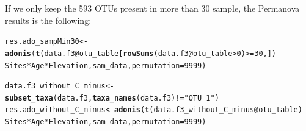 \documentclass[12pt]{article}\usepackage[]{graphicx}\usepackage[]{color}
\makeatletter
\newcommand{\hlnum}[1]{\textcolor[rgb]{0.686,0.059,0.569}{#1}}%
\newcommand{\hlstr}[1]{\textcolor[rgb]{0.192,0.494,0.8}{#1}}%
\newcommand{\hlopt}[1]{\textcolor[rgb]{0,0,0}{#1}}%
\newcommand{\hlstd}[1]{\textcolor[rgb]{0.345,0.345,0.345}{#1}}%
\newcommand{\hlkwb}[1]{\textcolor[rgb]{0.69,0.353,0.396}{#1}}%
\newcommand{\hlkwc}[1]{\textcolor[rgb]{0.333,0.667,0.333}{#1}}%
\newcommand{\hlkwd}[1]{\textcolor[rgb]{0.737,0.353,0.396}{\textbf{#1}}}%
\newenvironment{kframe}{%
 \def\at@end@of@kframe{}%
 \ifinner\ifhmode%
  \def\at@end@of@kframe{\end{minipage}}%
  \begin{minipage}{\columnwidth}%
 \fi\fi%
 \def\FrameCommand##1{\hskip\@totalleftmargin \hskip-\fboxsep
 \colorbox{shadecolor}{##1}\hskip-\fboxsep
     \hskip-\linewidth \hskip-\@totalleftmargin \hskip\columnwidth}%
 \MakeFramed {\advance\hsize-\width
   \@totalleftmargin\z@ \linewidth\hsize
   \@setminipage}}%
 {\par\unskip\endMakeFramed%
 \at@end@of@kframe}
\newenvironment{knitrout}{}{} %
\numberwithin{figure}{section}
\makeatother
\begin{document}
If we only keep the 593 OTUs present in more than 30 sample, the Permanova results is the following:
\begin{knitrout}\small
{}\color{fgcolor}\begin{kframe}
\begin{alltt}
\hlstd{res.ado_sampMin30} \hlkwb{<-} \hlkwd{adonis}\hlstd{(}\hlkwd{t}\hlstd{(data.f3}\hlopt{@}\hlkwc{otu_table}\hlstd{[}\hlkwd{rowSums}\hlstd{(data.f3}\hlopt{@}\hlkwc{otu_table}\hlopt{>}\hlnum{0}\hlstd{)}\hlopt{>=}\hlnum{30}\hlstd{,])} \hlopt{~}
                              \hlstd{Sites} \hlopt{*} \hlstd{Age} \hlopt{*} \hlstd{Elevation, sam_data,} \hlkwc{permutation} \hlstd{=} \hlnum{9999}\hlstd{)}
\end{alltt}
\end{kframe}
\end{knitrout}

\begin{knitrout}\small
{}\color{fgcolor}\begin{kframe}
\begin{alltt}
\hlstd{data.f3_without_C_minus} \hlkwb{<-} \hlkwd{subset_taxa}\hlstd{(data.f3,} \hlkwd{taxa_names}\hlstd{(data.f3)}\hlopt{!=}\hlstr{"OTU_1"}\hlstd{)}
\hlstd{res.ado_without_C_minus} \hlkwb{<-} \hlkwd{adonis}\hlstd{(}\hlkwd{t}\hlstd{(data.f3_without_C_minus}\hlopt{@}\hlkwc{otu_table}\hlstd{)} \hlopt{~}
                              \hlstd{Sites} \hlopt{*} \hlstd{Age} \hlopt{*} \hlstd{Elevation, sam_data,} \hlkwc{permutation} \hlstd{=} \hlnum{9999}\hlstd{)}
\end{alltt}
\end{kframe}
\end{knitrout}
\end{document}
